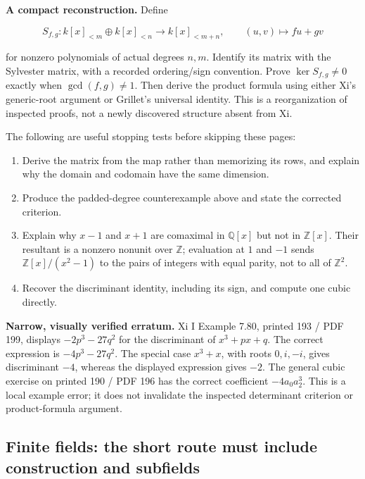 \documentclass[
  11pt,
]{article}
\providecommand{\tightlist}{%
  \setlength{\itemsep}{0pt}\setlength{\parskip}{0pt}}
\begin{document}
\textbf{A compact reconstruction.} Define

\[
S_{f,g}:k[x]_{<m}\oplus k[x]_{<n}\longrightarrow k[x]_{<m+n},
\qquad (u,v)\longmapsto fu+gv
\]

for nonzero polynomials of actual degrees \(n,m\). Identify its matrix
with the Sylvester matrix, with a recorded ordering/sign convention.
Prove \(\ker S_{f,g}\neq0\) exactly when \(\gcd(f,g)\neq1\). Then derive
the product formula using either Xi's generic-root argument or Grillet's
universal identity. This is a reorganization of inspected proofs, not a
newly discovered structure absent from Xi.

The following are useful stopping tests before skipping these pages:

\begin{enumerate}
\def\labelenumi{\arabic{enumi}.}
\tightlist
\item
  Derive the matrix from the map rather than memorizing its rows, and
  explain why the domain and codomain have the same dimension.
\item
  Produce the padded-degree counterexample above and state the corrected
  criterion.
\item
  Explain why \(x-1\) and \(x+1\) are comaximal in \(\mathbb Q[x]\) but
  not in \(\mathbb Z[x]\). Their resultant is a nonzero nonunit over
  \(\mathbb Z\); evaluation at \(1\) and \(-1\) sends
  \(\mathbb Z[x]/(x^2-1)\) to the pairs of integers with equal parity,
  not to all of \(\mathbb Z^2\).
\item
  Recover the discriminant identity, including its sign, and compute one
  cubic directly.
\end{enumerate}

\textbf{Narrow, visually verified erratum.} Xi I Example 7.80, printed
193 / PDF 199, displays \(-2p^3-27q^2\) for the discriminant of
\(x^3+px+q\). The correct expression is \(-4p^3-27q^2\). The special
case \(x^3+x\), with roots \(0,i,-i\), gives discriminant \(-4\),
whereas the displayed expression gives \(-2\). The general cubic
exercise on printed 190 / PDF 196 has the correct coefficient
\(-4a_0a_2^3\). This is a local example error; it does not invalidate
the inspected determinant criterion or product-formula argument.

\subsection{Finite fields: the short route must include construction and
subfields}\label{finite-fields-the-short-route-must-include-construction-and-subfields}
\end{document}

